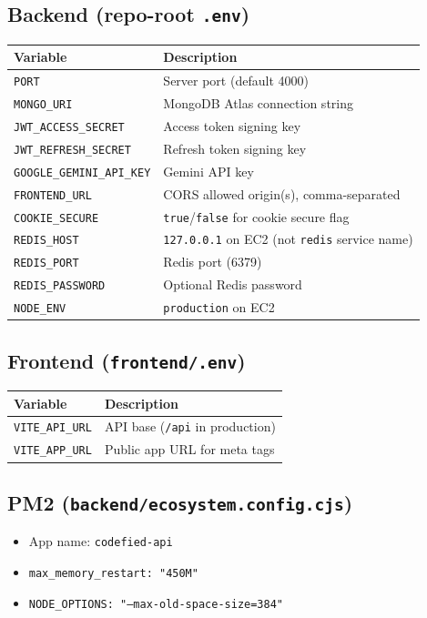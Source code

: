 \documentclass[11pt,a4paper]{article}
\begin{document}
\subsection{Backend (repo-root \texttt{.env})}
\begin{table}[h]
\centering
\small
\begin{tabular}{@{}ll@{}}
\toprule
\textbf{Variable} & \textbf{Description} \\
\midrule
\texttt{PORT} & Server port (default 4000) \\
\texttt{MONGO\_URI} & MongoDB Atlas connection string \\
\texttt{JWT\_ACCESS\_SECRET} & Access token signing key \\
\texttt{JWT\_REFRESH\_SECRET} & Refresh token signing key \\
\texttt{GOOGLE\_GEMINI\_API\_KEY} & Gemini API key \\
\texttt{FRONTEND\_URL} & CORS allowed origin(s), comma-separated \\
\texttt{COOKIE\_SECURE} & \texttt{true}/\texttt{false} for cookie secure flag \\
\texttt{REDIS\_HOST} & \texttt{127.0.0.1} on EC2 (not \texttt{redis} service name) \\
\texttt{REDIS\_PORT} & Redis port (6379) \\
\texttt{REDIS\_PASSWORD} & Optional Redis password \\
\texttt{NODE\_ENV} & \texttt{production} on EC2 \\
\bottomrule
\end{tabular}
\end{table}

\subsection{Frontend (\texttt{frontend/.env})}
\begin{table}[h]
\centering
\small
\begin{tabular}{@{}ll@{}}
\toprule
\textbf{Variable} & \textbf{Description} \\
\midrule
\texttt{VITE\_API\_URL} & API base (\texttt{/api} in production) \\
\texttt{VITE\_APP\_URL} & Public app URL for meta tags \\
\bottomrule
\end{tabular}
\end{table}

\subsection{PM2 (\texttt{backend/ecosystem.config.cjs})}
\begin{itemize}[noitemsep]
  \item App name: \texttt{codefied-api}
  \item \texttt{max\_memory\_restart: "450M"}
  \item \texttt{NODE\_OPTIONS: "--max-old-space-size=384"}
\end{itemize}
\end{document}
